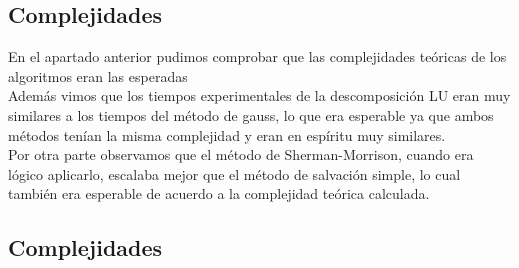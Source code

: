 \subsection{Complejidades}
En el apartado anterior pudimos comprobar que las complejidades teóricas de los algoritmos eran las esperadas 
\\
Además vimos que los tiempos experimentales de la descomposición LU eran muy similares a los tiempos del método de gauss, lo que era esperable ya que ambos métodos tenían la misma complejidad y eran en espíritu muy similares.
\\
Por otra parte observamos que el método de Sherman-Morrison, cuando era lógico aplicarlo, escalaba mejor que el método de salvación simple, lo cual también era esperable de acuerdo a la complejidad teórica calculada.
\subsection{Complejidades}
\Completar
